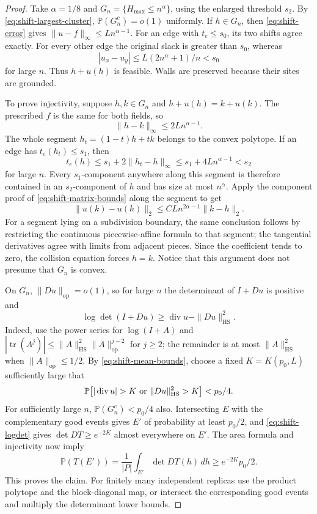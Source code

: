 \begin{proof}
Take $\alpha=1/8$ and
$G_n=\{H_{\max}\leq n^\alpha\}$, using the enlarged threshold $s_2$.
By \eqref{eq:shift-largest-cluster},
$\mathbb P(G_n^c)=o(1)$ uniformly.
If $h\in G_n$, then \eqref{eq:shift-error} gives
$\|u-f\|_\infty\leq Ln^{\alpha-1}$.
For an edge with $t_e\leq s_0$, its two shifts agree exactly.
For every other edge the original slack is greater than $s_0$, whereas
\[
 |u_x-u_y|\leq L(2n^\alpha+1)/n<s_0
\]
for large $n$. Thus $h+u(h)$ is feasible. Walls are preserved because
their sites are grounded.

To prove injectivity, suppose $h,k\in G_n$ and $h+u(h)=k+u(k)$.
The prescribed $f$ is the same for both fields, so
\begin{equation}\label{eq:shift-collision}
 \|h-k\|_\infty\leq 2Ln^{\alpha-1}.
\end{equation}
The whole segment $h_t=(1-t)h+tk$ belongs to the convex polytope.
If an edge has $t_e(h_t)\leq s_1$, then
\[
 t_e(h)\leq s_1+2\|h_t-h\|_\infty
 \leq s_1+4Ln^{\alpha-1}<s_2
\]
for large $n$. Every $s_1$-component anywhere along this segment is
therefore contained in an $s_2$-component of $h$ and has size at most
$n^\alpha$. Apply the component proof of
\eqref{eq:shift-matrix-bounds} along the segment to get
\[
 \|u(k)-u(h)\|_2
 \leq C L n^{2\alpha-1}\|k-h\|_2.
\]
For a segment lying on a subdivision boundary, the same conclusion follows
by restricting the continuous piecewise-affine formula to that segment;
the tangential derivatives agree with limits from adjacent pieces.
Since the coefficient tends to zero, the collision equation forces $h=k$.
Notice that this argument does not presume that $G_n$ is convex.

On $G_n$, $\|Du\|_{\mathrm{op}}=o(1)$, so for large $n$ the determinant
of $I+Du$ is positive and
\begin{equation}\label{eq:shift-logdet}
 \log\det(I+Du)\geq
       \operatorname{div}u-\|Du\|_{\mathrm{HS}}^2.
\end{equation}
Indeed, use the power series for $\log(I+A)$ and
$|\operatorname{tr}(A^j)|
\leq\|A\|_{\mathrm{HS}}^2\|A\|_{\mathrm{op}}^{j-2}$ for $j\geq2$;
the remainder is at most $\|A\|_{\mathrm{HS}}^2$ when
$\|A\|_{\mathrm{op}}\leq1/2$.
By \eqref{eq:shift-mean-bounds}, choose a fixed $K=K(p_0,L)$ sufficiently
large that
\[
 \mathbb P\bigl[
 |\operatorname{div}u|>K
 \ \hbox{or}\ \|Du\|_{\mathrm{HS}}^2>K\bigr]<p_0/4.
\]
For sufficiently large $n$, $\mathbb P(G_n^c)<p_0/4$ also. Intersecting
$E$ with the complementary good events gives $E'$ of probability at least
$p_0/2$, and \eqref{eq:shift-logdet} gives
$\det DT\geq e^{-2K}$ almost everywhere on $E'$.
The area formula and injectivity now imply
\[
 \mathbb P(T(E'))
 =\frac1{|P|}\int_{E'}\det DT(h)\,dh
 \geq e^{-2K}p_0/2.
\]
This proves the claim. For finitely many independent replicas use the
product polytope and the block-diagonal map, or intersect the corresponding
good events and multiply the determinant lower bounds.
\end{proof}

